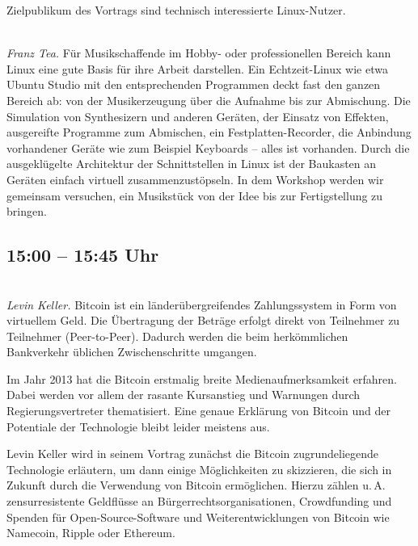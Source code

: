 \documentclass[10pt,a4paper,ngerman,landscape]{scrartcl}
\let\origdescription\description
\renewenvironment{description}{
  \setlength{\leftmargini}{0em}
  \origdescription
  \setlength{\itemindent}{0em}
  \setlength{\itemsep}{1.2em}
  \setlength{\labelsep}{\textwidth}
}
{\endlist}
\newcommand{\vorschub}{\mbox{}\\[-0.5em]}
\begin{document}
\begin{multicols}{3}
\begin{description}
Zielpublikum des Vortrags sind technisch interessierte Linux-Nutzer.




\item[Workshop: Linux im Musikstudio]\vorschub
\textsl{Franz Tea.}
Für Musikschaffende im Hobby- oder professionellen Bereich kann Linux eine gute
Basis für ihre Arbeit darstellen. Ein Echtzeit-Linux wie etwa Ubuntu Studio mit
den entsprechenden Programmen deckt fast den ganzen Bereich ab: von der
Musikerzeugung über die Aufnahme bis zur Abmischung. Die Simulation von
Synthesizern und anderen Geräten, der Einsatz von Effekten, ausgereifte
Programme zum Abmischen, ein Festplatten-Recorder, die Anbindung vorhandener
Geräte wie zum Beispiel Keyboards -- alles ist vorhanden. Durch die
ausgeklügelte Architektur der Schnittstellen in Linux ist der Baukasten an
Geräten einfach virtuell zusammenzustöpseln. In dem Workshop werden wir
gemeinsam versuchen, ein Musikstück von der Idee bis zur Fertigstellung zu
bringen.
\end{description}


\subsection{15:00 -- 15:45 Uhr}

\begin{description}
\item[Bitcoin -- Open Sourcing Money]\vorschub
\textsl{Levin Keller.}
Bitcoin ist ein länderübergreifendes Zahlungssystem in Form von virtuellem Geld. Die Über\-tra\-gung der Beträge erfolgt direkt von Teilnehmer zu Teilnehmer (Peer-to-Peer). Dadurch werden die beim herkömmlichen Bankverkehr üblichen Zwischenschritte umgangen.

Im Jahr 2013 hat die Bitcoin erstmalig breite
Medienaufmerksamkeit erfahren. Dabei werden vor allem der rasante
Kursanstieg und Warnungen durch Regierungsvertreter thematisiert. Eine
genaue Erklärung von Bitcoin und der Potentiale der Technologie bleibt
leider meistens aus.
\vfill
\columnbreak

Levin Keller wird in seinem Vortrag zunächst die
Bit\-coin zugrundeliegende Technologie erläutern, um dann einige
Möglichkeiten zu skizzieren, die sich in Zukunft durch die Verwendung von
Bitcoin ermöglichen. Hierzu zählen u.\,A. zensurresistente Geldflüsse an
Bürgerrechtsorganisationen, Crowdfunding und Spenden für
Open-Source-Software und Weiterentwicklungen von Bitcoin wie Namecoin,
Ripple oder Ethereum.


\end{description}
\end{multicols}
\end{document}
